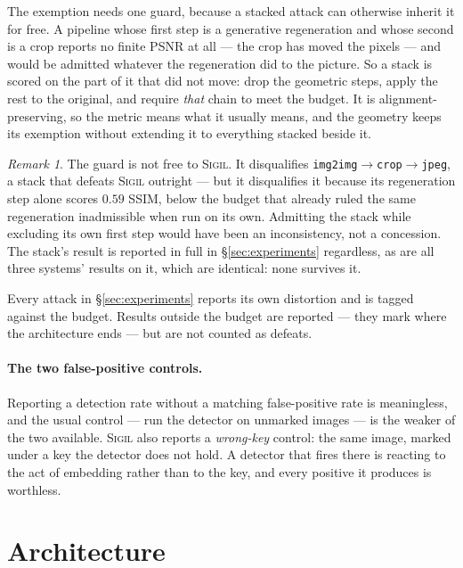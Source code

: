 \documentclass[10pt,twocolumn]{article}
\theoremstyle{definition}
\theoremstyle{remark}
\newtheorem{remark}[theorem]{Remark}
\newcommand{\sigil}{\textsc{Sigil}}
\begin{document}
The exemption needs one guard, because a stacked attack can otherwise inherit it
for free. A pipeline whose first step is a generative regeneration and whose
second is a crop reports no finite PSNR at all --- the crop has moved the pixels
--- and would be admitted whatever the regeneration did to the picture. So a
stack is scored on the part of it that did not move: drop the geometric steps,
apply the rest to the original, and require \emph{that} chain to meet the budget.
It is alignment-preserving, so the metric means what it usually means, and the
geometry keeps its exemption without extending it to everything stacked beside
it.

\begin{remark}
The guard is not free to \sigil{}. It disqualifies
\texttt{img2img}$\to$\texttt{crop}$\to$\texttt{jpeg}, a stack that defeats
\sigil{} outright --- but it disqualifies it because its regeneration step alone
scores \(0.59\) SSIM, below the budget that already ruled the same regeneration
inadmissible when run on its own. Admitting the stack while excluding its own
first step would have been an inconsistency, not a concession. The stack's result
is reported in full in \S\ref{sec:experiments} regardless, as are all three
systems' results on it, which are identical: none survives it.
\end{remark}

Every attack in \S\ref{sec:experiments} reports its own distortion and is tagged
against the budget. Results outside the budget are reported --- they mark where
the architecture ends --- but are not counted as defeats.

\paragraph{The two false-positive controls.} Reporting a detection rate without
a matching false-positive rate is meaningless, and the usual control --- run the
detector on unmarked images --- is the weaker of the two available. \sigil{} also
reports a \emph{wrong-key} control: the same image, marked under a key the
detector does not hold. A detector that fires there is reacting to the act of
embedding rather than to the key, and every positive it produces is worthless.

\section{Architecture}
\label{sec:architecture}
\end{document}
